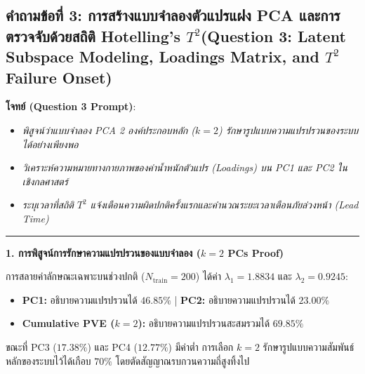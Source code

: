 \documentclass[12pt,a4paper]{article}
\begin{document}
\clearpage
\subsection*{คำถามข้อที่ 3: การสร้างแบบจำลองตัวแปรแฝง PCA และการตรวจจับด้วยสถิติ Hotelling's $T^2$\newline \normalsize(Question 3: Latent Subspace Modeling, Loadings Matrix, and $T^2$ Failure Onset)}
\vspace{-0.5em}

\begin{ansbox}[unbreakable, fontupper={\fontsize{9.6pt}{12.6pt}\selectfont}, left=6pt, right=6pt, top=3pt, bottom=3pt]
\textbf{โจทย์ (Question 3 Prompt)}:
\begin{itemize}[leftmargin=1.2em, itemsep=0pt, topsep=0pt, parsep=0pt]
    \item[(a)] \textit{พิสูจน์ว่าแบบจำลอง PCA 2 องค์ประกอบหลัก ($k=2$) รักษารูปแบบความแปรปรวนของระบบได้อย่างเพียงพอ}
    \item[(b)] \textit{วิเคราะห์ความหมายทางกายภาพของค่าน้ำหนักตัวแปร (Loadings) บน PC1 และ PC2 ในเชิงกลศาสตร์}
    \item[(c)] \textit{ระบุเวลาที่สถิติ $T^2$ แจ้งเตือนความผิดปกติครั้งแรกและคำนวณระยะเวลาเตือนภัยล่วงหน้า (Lead Time)}
\end{itemize}

\vspace{-0.2em}
\noindent\rule{\linewidth}{0.4pt}
\vspace{-0.2em}

\noindent\textbf{\normalsize 1. การพิสูจน์การรักษาความแปรปรวนของแบบจำลอง ($k=2$ PCs Proof)}\par\vspace{0.05em}
การสลายค่าลักษณะเฉพาะบนช่วงปกติ ($N_{\text{train}} = 200$) ได้ค่า $\lambda_1 = 1.8834$ และ $\lambda_2 = 0.9245$:
\begin{itemize}[leftmargin=1.2em, itemsep=0.5pt, topsep=0.5pt]
    \item \textbf{PC1:} อธิบายความแปรปรวนได้ \textbf{$46.85\%$} | \textbf{PC2:} อธิบายความแปรปรวนได้ \textbf{$23.00\%$}
    \item \textbf{Cumulative PVE ($k=2$):} อธิบายความแปรปรวนสะสมรวมได้ \textbf{$69.85\%$}
\end{itemize}
ขณะที่ PC3 ($17.38\%$) และ PC4 ($12.77\%$) มีค่าต่ำ การเลือก $k=2$ รักษารูปแบบความสัมพันธ์หลักของระบบไว้ได้เกือบ $70\%$ โดยตัดสัญญาณรบกวนความถี่สูงทิ้งไป


\end{ansbox}
\end{document}

